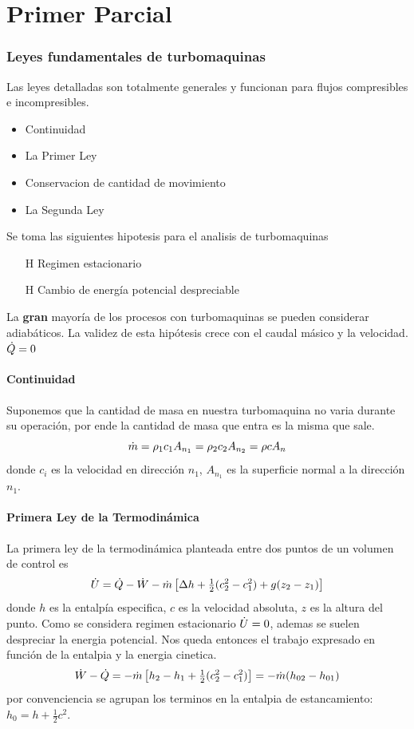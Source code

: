 \documentclass{article}
\begin{document}
\part{Primer Parcial}

\section{Leyes fundamentales de turbomaquinas}
Las leyes detalladas son totalmente generales y funcionan para flujos compresibles e incompresibles.
\begin{itemize}
    \item Continuidad
    \item La Primer Ley
    \item Conservacion de cantidad de movimiento
    \item La Segunda Ley
\end{itemize}
Se toma las siguientes hipotesis para el analisis de turbomaquinas
\begin{itemize}
    \item[H] Regimen estacionario
    \item[H] Cambio de energía potencial despreciable
\end{itemize}

La \textbf{gran} mayoría de los procesos con turbomaquinas se pueden considerar adiabáticos. La validez de esta hipótesis crece con el caudal másico y la velocidad. $\dot{Q}=0$ 

\subsection{Continuidad}
Suponemos que la cantidad de masa en nuestra turbomaquina no varia durante su operación, por ende la cantidad de masa que entra es la misma que sale.
\[
\dot{m} = \rho_1 c_1 A_{n_1} = \rho_2 c_2 A_{n_2} = \rho c A_n
\]
donde $c_i$ es la velocidad en dirección $n_1$, $A_{n_1}$ es la superficie normal a la dirección $n_1$.

\subsection{Primera Ley de la Termodinámica}
La primera ley de la termodinámica planteada entre dos puntos de un volumen de control es
\[
\dot{U} = \dot{Q} - \dot{W} - \dot{m} \left[\Delta h + \tfrac{1}{2}(c_2^2-c_1^2) + g(z_2 - z_1)\right]
\]
donde $h$ es la entalpía especifica, $c$ es la velocidad absoluta, $z$ es la altura del punto. Como se considera regimen estacionario $\dot{U}=0$, ademas se suelen despreciar la energia potencial. Nos queda entonces el trabajo expresado en función de la entalpia y la energia cinetica.
\begin{equation} \label{ec:PrimeraLeyTurbomaquinas}
    \dot{W} - \dot{Q} = - \dot{m} \left[ h_2-h_1 +\tfrac{1}{2}(c_2^2-c_1^2) \right] = - \dot{m} (h_{02} - h_{01})
\end{equation}
por convenciencia se agrupan los terminos en la entalpia de estancamiento: $h_0 = h+\tfrac{1}{2}c^2$.
\end{document}
